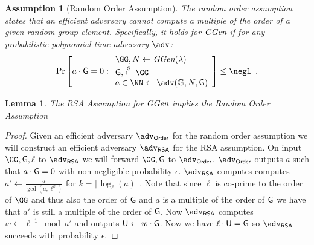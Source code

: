 \documentclass{article}
\theoremstyle{Definition}
\newtheorem{lemma}{Lemma}
\newtheorem{assumption}{Assumption}
\begin{document}
\begin{assumption}[Random Order Assumption]
	The random order assumption states that an efficient adversary cannot compute a multiple of the order of a given random group element. Specifically, it holds for $\textit{GGen}$ if for any probabilistic polynomial time adversary $\adv$:
	\[
    \Pr\left[a\cdot \Generator =0:
    \begin{array}{l}
         \GG, N \leftarrow \ggen(\lambda)  \\
         \Generator, \sample \GG\\
         a \in \NN \leftarrow \adv(\mathbb{G},N, \Generator) \\
    \end{array}\right] \leq \negl \enspace .
    \]
\end{assumption}
\begin{lemma}
\label{lem:roa-to-rsa}
	The RSA Assumption for $\textit{GGen}$ implies the Random Order Assumption
	\end{lemma}
\begin{proof}
	Given an efficient adversary $\adv_{\textsf{Order}}$ for the random order assumption we will construct an efficient adversary $\adv_{\textsf{RSA}}$ for the RSA assumption. On input $\GG,\Generator,\ell$ to $\adv_{\textsf{RSA}}$ we will forward $\GG,\Generator$ to $\adv_{\textsf{Order}}$. $\adv_{\textsf{Order}}$ outputs $a$ such that $a\cdot \mathsf{G}=0$ with non-negligible probability $\epsilon$. 
	$\adv_{\textsf{RSA}}$ computes computes $a'\gets \frac{a}{\gcd(a,\ell^k)}$ for $k=\lceil\log_\ell(a)\rceil$. Note that since $\ell$ is co-prime to the order of $\GG$ and thus also the order of $\mathsf{G}$ and $a$ is a multiple of the order of $\mathsf{G}$ we have that $a'$ is still a multiple of the order of $\mathsf{G}$. Now $\adv_{\textsf{RSA}}$ computes $w\gets \ell^{-1} \bmod a'$ and outputs $\mathsf{U} \gets w\cdot \mathsf{G}$. Now we have $\ell \cdot \mathsf{U}=\mathsf{G}$ so $\adv_{\textsf{RSA}}$ succeeds with probability $\epsilon$.
\end{proof}
\end{document}
